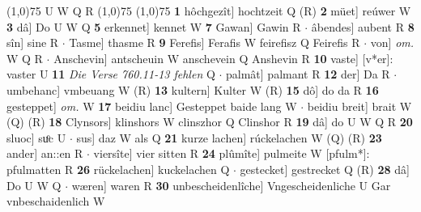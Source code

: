 \documentclass[8pt,a4paper,notitlepage]{article}
\begin{document}
\begin{table}[ht]
\begin{minipage}[t]{0.5\linewidth}
\line(1,0){75} \newline
U W Q R \newline
\line(1,0){75} \newline
\newline
\line(1,0){75} \newline
\textbf{1} hôchgezît] hochtzeit Q (R) \textbf{2} müet] reúwer W \textbf{3} dâ] Do U W Q \textbf{5} erkennet] kennet W \textbf{7} Gawan] Gawin R  $\cdot$ âbendes] aubent R \textbf{8} sîn] sine R  $\cdot$ Tasme] thasme R \textbf{9} Ferefis] Ferafis W feirefisz Q Feirefis R  $\cdot$ von] \textit{om.} W Q R  $\cdot$ Anschevin] antscheuin W anschevein Q Anshevin R \textbf{10} vaste] [v*er]: vaster U \textbf{11} \textit{Die Verse 760.11-13 fehlen} Q   $\cdot$ palmât] palmant R \textbf{12} der] Da R  $\cdot$ umbehanc] vmbeuang W (R) \textbf{13} kultern] Kulter W (R) \textbf{15} dô] do da R \textbf{16} gesteppet] \textit{om.} W \textbf{17} beidiu lanc] Gesteppet baide lang W  $\cdot$ beidiu breit] brait W (Q) (R) \textbf{18} Clynsors] klinshors W clinszhor Q Clinshor R \textbf{19} dâ] do U W Q R \textbf{20} sluoc] suͦc U  $\cdot$ sus] daz W als Q \textbf{21} kurze lachen] rúckelachen W (Q) (R) \textbf{23} ander] an::en R  $\cdot$ viersîte] vier sitten R \textbf{24} plûmîte] pulmeite W [pfulm*]: pfulmatten R \textbf{26} rückelachen] kuckelachen Q  $\cdot$ gestecket] gestrecket Q (R) \textbf{28} dâ] Do U W Q  $\cdot$ wæren] waren R \textbf{30} unbescheidenlîche] Vngescheidenliche U Gar vnbeschaidenlich W \newline
\end{minipage}
\end{table}
\end{document}
